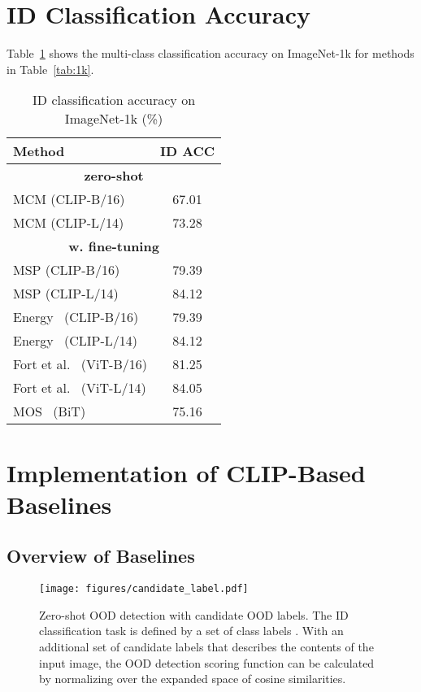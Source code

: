\documentclass{article}
\begin{document}
\section{ID Classification Accuracy}
\label{sec:acc}
Table~\ref{tab:acc} shows the multi-class classification accuracy on ImageNet-1k for methods in Table~\ref{tab:1k}.
\begin{table}[hbt]
\caption{ID classification accuracy on ImageNet-1k (\%)}
\label{tab:acc}
\centering
\small
\begin{tabular}{lc}
\toprule
\textbf{Method} & \textbf{ID ACC}\\
\midrule
\multicolumn{2}{c}{\textbf{zero-shot }}   \\ 
MCM (CLIP-B/16) &67.01 \\
MCM (CLIP-L/14) & 73.28\\
\multicolumn{2}{c}{\textbf{w. fine-tuning }}   \\ 
MSP (CLIP-B/16) & 79.39 \\
MSP (CLIP-L/14) &84.12\\
Energy~\cite{liu2020energy} (CLIP-B/16)&79.39 \\
Energy~\cite{liu2020energy} (CLIP-L/14) & 84.12\\
Fort et al.~\cite{fort2021exploring} (ViT-B/16) &81.25\\ 
Fort et al.~\cite{fort2021exploring} (ViT-L/14) & 84.05\\
MOS~\cite{huang2021mos} (BiT) & 75.16 \\
\bottomrule
\end{tabular}
\end{table}

\section{Implementation of CLIP-Based Baselines}
\subsection{Overview of Baselines}
\begin{figure*}[thb]
  \centering
    \texttt{[image: figures/candidate\_label.pdf]}
\caption{\small Zero-shot OOD detection with candidate OOD labels. The ID classification task is defined by a set of class labels . With an additional set of candidate labels   that describes the contents of the input image, the OOD detection scoring function can be calculated by normalizing over the expanded space of cosine similarities.}
\vspace{-0.3cm}
\label{fig:teaser_2}
\end{figure*}
\end{document}
